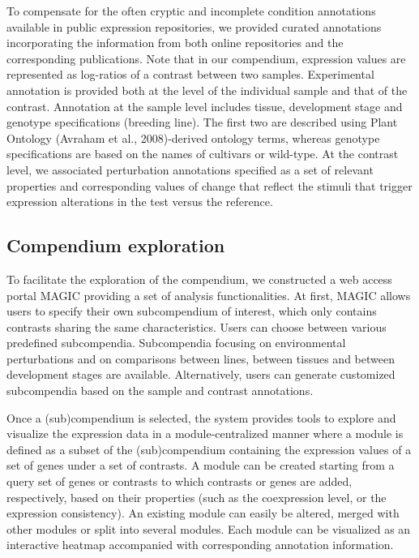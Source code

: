 To compensate for the often cryptic and incomplete condition annotations 
available in public expression repositories, we provided curated
annotations incorporating the information from both online repositories
and the corresponding publications. Note that in our compendium, expression 
values are represented as log-ratios of a contrast between two
samples. Experimental annotation is provided both at the level of the
individual sample and that of the contrast. Annotation at the sample
level includes tissue, development stage and genotype specifications
(breeding line). The first two are described using Plant Ontology
(Avraham et al., 2008)-derived ontology terms, whereas genotype specifications 
are based on the names of cultivars or wild-type. At the contrast
level, we associated perturbation annotations specified as a set of relevant
properties and corresponding values of change that reflect the stimuli that
trigger expression alterations in the test versus the reference.





\subsection{Compendium exploration}

To facilitate the exploration of the compendium, we constructed a web
access portal MAGIC providing a set of analysis functionalities. At first,
MAGIC allows users to specify their own subcompendium of interest,
which only contains contrasts sharing the same characteristics. Users can
choose between various predefined subcompendia. Subcompendia focusing 
on environmental perturbations and on comparisons between lines,
between tissues and between development stages are available.
Alternatively, users can generate customized subcompendia based on
the sample and contrast annotations.

Once a (sub)compendium is selected, the system provides tools to explore 
and visualize the expression data in a module-centralized manner
where a module is defined as a subset of the (sub)compendium containing
the expression values of a set of genes under a set of contrasts. A module
can be created starting from a query set of genes or contrasts to which
contrasts or genes are added, respectively, based on their properties (such
as the coexpression level, or the expression consistency). An existing
module can easily be altered, merged with other modules or split into
several modules. Each module can be visualized as an interactive heatmap
accompanied with corresponding annotation information.


